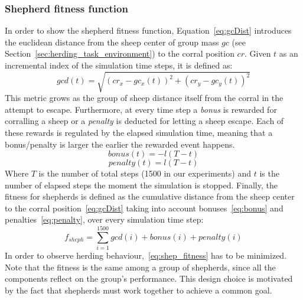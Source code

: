 \documentclass[conference]{IEEEtran}
\begin{document}
\vspace{0.5em}
\subsubsection{Shepherd fitness function}
In order to show the shepherd fitness function, Equation~\eqref{eq:gcDist} introduces the euclidean distance from the sheep center of group mass $gc$ (see Section~\ref{sec:herding_task_environment}) to the corral position $cr$.
Given $t$ as an incremental index of the simulation time steps, it is defined as:
\begin{equation} \label{eq:gcDist}
gcd(t) = \sqrt{(cr_x - gc_x(t))^2 + (cr_y - gc_y(t))^2}
\end{equation}
This metric grows as the group of sheep distance itself from the corral in the attempt to escape.
Furthermore, at every time step a \textit{bonus} is rewarded for corralling a sheep or a \textit{penalty} is deducted for letting a sheep escape. 
Each of these rewards is regulated by the elapsed simulation time, meaning that a bonus/penalty is larger the earlier the rewarded event happens.
\begin{equation} \label{eq:bonus}
bonus(t) = - l (T - t)
\end{equation}
\begin{equation} \label{eq:penalty}
penalty(t) = l (T - t)
\end{equation}
Where $T$ is the number of total steps (1500 in our experiments) and $t$ is the number of elapsed steps the moment the simulation is stopped.
Finally, the fitness for shepherds is defined as the cumulative distance from the sheep center to the corral position~\eqref{eq:gcDist} taking into account bonuses~\eqref{eq:bonus} and penalties~\eqref{eq:penalty}, over every simulation time step:
\begin{equation} \label{eq:shep_fitness}
f_{sheph} = \sum_{i=1}^{1500} gcd(i)	+ bonus(i) + penalty(i)
\end{equation}
In order to observe herding behaviour,~\eqref{eq:shep_fitness} has to be minimized.
Note that the fitness is the same among a group of shepherds, since all the components reflect on the group's performance. 
This design choice is motivated by the fact that shepherds must work together to achieve a common goal. 

\vspace{0.5em}
\end{document}
